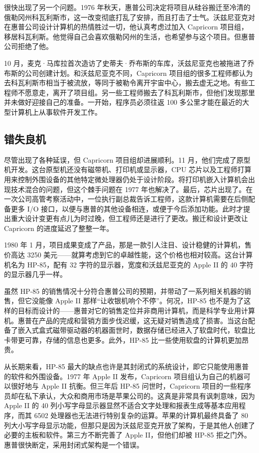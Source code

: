 \documentclass[12pt,UTF8]{ctexbook}
\begin{document}
很快出现了另一个问题。1976 年秋天，惠普公司决定将项目从硅谷搬迁至冷清的俄勒冈州科瓦利斯市，这一改变彻底打乱了安排，而且打击了士气。沃兹尼亚克对在惠普公司设计计算机的热情胜过一切，他认真考虑过加入 Capricorn 项目组，移居科瓦利斯。他觉得自己会喜欢俄勒冈州的生活，也希望参与这个项目。但惠普公司拒绝了他。

10 月，麦克·马库拉首次造访了史蒂夫·乔布斯的车库，沃兹尼亚克也被拖进了乔布斯的公司创建计划。和沃兹尼亚克不同，Capricorn 项目组的很多工程师都认为去科瓦利斯市相当于被流放，等同于被勒令离开宇宙中心，搬去虚无之地。有些工程师不愿意走，离开了项目组。另一些工程师搬去了科瓦利斯市，但他们发现那里并未做好迎接自己的准备。一开始，程序员必须往返 100 多公里才能在最近的大型计算机上从事软件开发工作。





\subsection{错失良机}


尽管出现了各种延误，但 Capricorn 项目组却进展顺利。11 月，他们完成了原型机开发。这台原型机还没有磁带机、打印机或显示器，CPU 芯片以及工程师打算用来控制外围设备的其他特定微处理器仍处于设计阶段。将打印机嵌入计算机会出现技术混合的问题，但这个棘手问题在 1977 年也解决了。最后，芯片出现了。在一次公司高管考察活动中，一位执行副总裁告诉工程师，这款计算机需要在后侧配备更多 I/O 接口，以便与惠普的其他设备相连，或便于今后添加功能。此时才提出重大设计变更有点儿为时过晚，但工程师还是进行了更改。搬迁和设计更改让 Capricorn 的进度延迟了整整一年。

1980 年 1 月，项目成果变成了产品，那是一款引人注目、设计稳健的计算机，售价高达 3250 美元——就算考虑到它的卓越性能，这个价格也相对较高。这台计算机名为 HP-85，配有 32 字符的显示器，宽度和沃兹尼亚克的 Apple II 的 40 字符的显示器几乎一样。

虽然 HP-85 的销售情况十分符合惠普公司的预期，并带动了一系列相关机器的销售，但它没能像 Apple II 那样“让收银机响个不停”。何况，HP-85 也不是为了这样的目标而设计的——惠普对它的销售定位并非商用计算机，而是科学专业用计算机。惠普在产品的完成和营销方面步伐迟缓，这无疑对销售造成了损害。当这台配备了嵌入式盒式磁带驱动器的机器面世时，数据存储已经进入了软盘时代，软盘比卡带更可靠，存储的信息也更多。此外，HP-85 比一些使用软盘的计算机更加昂贵。

从长期来看，HP-85 最大的缺点也许是其封闭式的系统设计，即它只能使用惠普的软件和外围设备。1977 年 Apple II 发布，Capricorn 项目组认为自己的机器可以很好地与 Apple II 抗衡。但三年后 HP-85 问世时，Capricorn 项目的一些程序员却在私下承认，大众和商用市场是苹果公司的。这真是非常具有讽刺意味，因为 Apple II 的 40 列小写字母显示器显然不适合文字处理和报表生成等基本应用程序，而其 6502 处理器也无法进行特别复杂的运算。苹果的计算机最终具备了 80 列大小写字母显示功能，但那只是因为沃兹尼亚克开放了架构，于是其他人创建了必要的主板和软件。第三方不断完善了 Apple II，但他们却被 HP-85 拒之门外。惠普很快断定，采用封闭式架构是一个错误。
\end{document}

